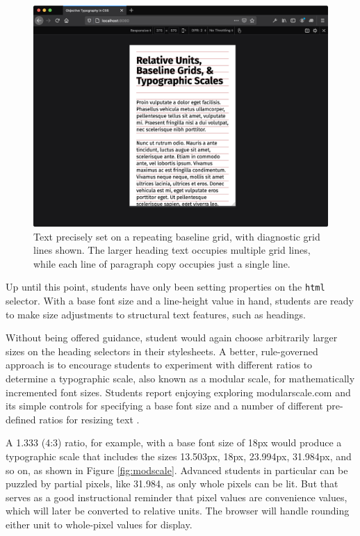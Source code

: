 \documentclass[sigplan,screen]{acmart}
\begin{document}
\begin{figure}
  \includegraphics[width=\linewidth]{rdv-narrow}
  \caption{Text precisely set on a repeating baseline grid, with diagnostic grid lines shown. The larger heading text occupies multiple grid lines, while each line of paragraph copy occupies just a single line.}
  \label{fig:rdv-narrow}
\end{figure}

Up until this point, students have only been setting properties on the \verb|html| selector. With a base font size and a line-height value in hand, students are ready to make size adjustments to structural text features, such as headings.

Without being offered guidance, student would again choose arbitrarily larger sizes on the heading selectors in their stylesheets. A better, rule-governed approach is to encourage students to experiment with different ratios to determine a typographic scale, also known as a modular scale, for mathematically incremented font sizes. Students report enjoying exploring modularscale.com and its simple controls for specifying a base font size and a number of different pre-defined ratios for resizing text \cite{modscale}.

A 1.333 (4:3) ratio, for example, with a base font size of 18px would produce a typographic scale that includes the sizes 13.503px, 18px, 23.994px, 31.984px, and so on, as shown in Figure \ref{fig:modscale}. Advanced students in particular can be puzzled by partial pixels, like 31.984, as only whole pixels can be lit. But that serves as a good instructional reminder that pixel values are convenience values, which will later be converted to relative units. The browser will handle rounding  either unit to whole-pixel values for display.
\end{document}
